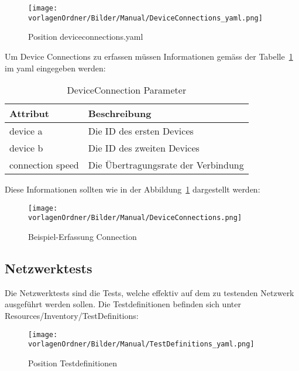 \documentclass[]{subfiles}
\begin{document}
		\begin{figure}[h!]
			\begin{center}
				\texttt{[image: \\vorlagenOrdner/Bilder/Manual/DeviceConnections\_yaml.png]}
				\caption{Position deviceconnections.yaml}
			\end{center}
		\end{figure}

		Um Device Connections zu erfassen müssen Informationen gemäss der Tabelle~\ref{table:DeviceConnectionParameter} im yaml eingegeben werden:

		\begin{table}[h!]
			\begin{tabularx}{\textwidth}{ll}
			\toprule
			Attribut & Beschreibung \\
			\midrule
			device a & Die ID des ersten Devices \\
			device b & Die ID des zweiten Devices \\
			connection speed & Die Übertragungsrate der Verbindung\\
			\midrule
			\end{tabularx}
			\caption{DeviceConnection Parameter}
			\label{table:DeviceConnectionParameter}
		\end{table}
		

		Diese Informationen sollten wie in der Abbildung~\ref{fig:ErfassungConnection} dargestellt werden: 

		\begin{figure}[h!]
			\begin{center}
				\texttt{[image: \\vorlagenOrdner/Bilder/Manual/DeviceConnections.png]}
				\caption{Beispiel-Erfassung Connection}
				\label{fig:ErfassungConnection}
			\end{center}
		\end{figure}

		\newpage

\subsection{Netzwerktests}
	Die Netzwerktests sind die Tests, welche effektiv auf dem zu testenden Netzwerk 
	ausgeführt werden sollen.
	Die Testdefinitionen befinden sich unter Resources/Inventory/TestDefinitions:

	\begin{figure}[h!]
		\begin{center}
			\texttt{[image: \\vorlagenOrdner/Bilder/Manual/TestDefinitions\_yaml.png]}
			\caption{Position Testdefinitionen}
		\end{center}
	\end{figure}
\end{document}
